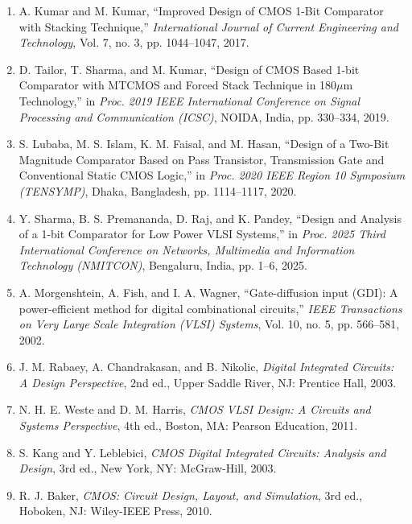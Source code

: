 \documentclass[12pt,a4paper,oneside]{report}
\begin{document}
\begin{enumerate}
\item[{[1]}] A. Kumar and M. Kumar, ``Improved Design of CMOS 1-Bit Comparator with Stacking Technique,'' \textit{International Journal of Current Engineering and Technology}, Vol. 7, no. 3, pp. 1044--1047, 2017.

\item[{[2]}] D. Tailor, T. Sharma, and M. Kumar, ``Design of CMOS Based 1-bit Comparator with MTCMOS and Forced Stack Technique in 180$\mu$m Technology,'' in \textit{Proc. 2019 IEEE International Conference on Signal Processing and Communication (ICSC)}, NOIDA, India, pp. 330--334, 2019.

\item[{[3]}] S. Lubaba, M. S. Islam, K. M. Faisal, and M. Hasan, ``Design of a Two-Bit Magnitude Comparator Based on Pass Transistor, Transmission Gate and Conventional Static CMOS Logic,'' in \textit{Proc. 2020 IEEE Region 10 Symposium (TENSYMP)}, Dhaka, Bangladesh, pp. 1114--1117, 2020.

\item[{[4]}] Y. Sharma, B. S. Premananda, D. Raj, and K. Pandey, ``Design and Analysis of a 1-bit Comparator for Low Power VLSI Systems,'' in \textit{Proc. 2025 Third International Conference on Networks, Multimedia and Information Technology (NMITCON)}, Bengaluru, India, pp. 1--6, 2025.

\item[{[5]}] A. Morgenshtein, A. Fish, and I. A. Wagner, ``Gate-diffusion input (GDI): A power-efficient method for digital combinational circuits,'' \textit{IEEE Transactions on Very Large Scale Integration (VLSI) Systems}, Vol. 10, no. 5, pp. 566--581, 2002.

\item[{[6]}] J. M. Rabaey, A. Chandrakasan, and B. Nikolic, \textit{Digital Integrated Circuits: A Design Perspective}, 2nd ed., Upper Saddle River, NJ: Prentice Hall, 2003.

\item[{[7]}] N. H. E. Weste and D. M. Harris, \textit{CMOS VLSI Design: A Circuits and Systems Perspective}, 4th ed., Boston, MA: Pearson Education, 2011.

\item[{[8]}] S. Kang and Y. Leblebici, \textit{CMOS Digital Integrated Circuits: Analysis and Design}, 3rd ed., New York, NY: McGraw-Hill, 2003.

\item[{[9]}] R. J. Baker, \textit{CMOS: Circuit Design, Layout, and Simulation}, 3rd ed., Hoboken, NJ: Wiley-IEEE Press, 2010.


\end{enumerate}
\end{document}
